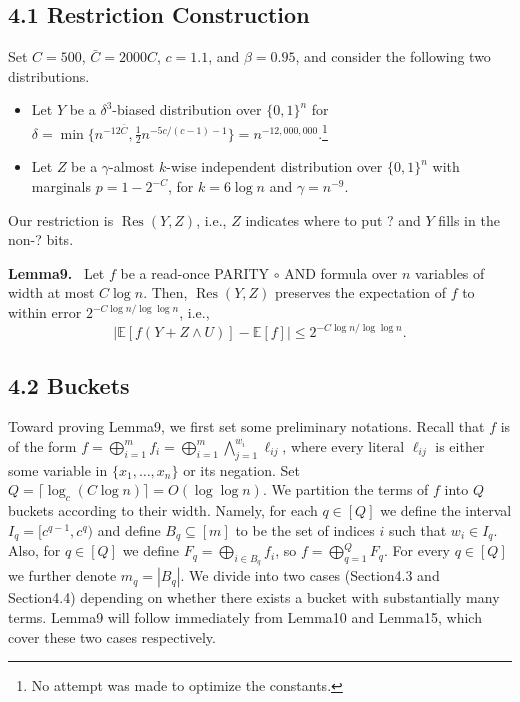 \documentclass[10pt,a4paper]{article}
\newenvironment{authorclaim}[1]{\par\medskip\noindent\textbf{#1.}\ \ignorespaces}{\par\medskip}
\begin{document}
\subsection*{4.1 Restriction Construction}
Set $C=500$, $\bar C=2000C$, $c=1.1$, and $\beta=0.95$, and consider the following two distributions.
\begin{itemize}
\item Let $Y$ be a $\delta^3$-biased distribution over $\{0,1\}^n$ for $\delta=\min\{n^{-12\bar C},\frac12n^{-5c/(c-1)-1}\}=n^{-12,000,000}$.\footnote{No attempt was made to optimize the constants.}
\item Let $Z$ be a $\gamma$-almost $k$-wise independent distribution over $\{0,1\}^n$ with marginals $p=1-2^{-C}$, for $k=6\log n$ and $\gamma=n^{-9}$.
\end{itemize}
Our restriction is $\operatorname{Res}(Y,Z)$, i.e., $Z$ indicates where to put ? and $Y$ fills in the non-? bits.
\begin{authorclaim}{Lemma9}
Let $f$ be a read-once PARITY $\circ$ AND formula over $n$ variables of width at most $C\log n$. Then, $\operatorname{Res}(Y,Z)$ preserves the expectation of $f$ to within error $2^{-C\log n/\log\log n}$, i.e.,
\[
|\mathbb E[f(Y+Z\wedge U)]-\mathbb E[f]|\le2^{-C\log n/\log\log n}.
\]
\end{authorclaim}
\subsection*{4.2 Buckets}
Toward proving Lemma9, we first set some preliminary notations. Recall that $f$ is of the form $f=\bigoplus_{i=1}^mf_i=\bigoplus_{i=1}^m\bigwedge_{j=1}^{w_i}\ell_{ij}$, where every literal $\ell_{ij}$ is either some variable in $\{x_1,\ldots,x_n\}$ or its negation.
Set $Q=\lceil\log_c(C\log n)\rceil=O(\log\log n)$. We partition the terms of $f$ into $Q$ buckets according to their width. Namely, for each $q\in[Q]$ we define the interval $I_q=[c^{q-1},c^q)$ and define $B_q\subseteq[m]$ to be the set of indices $i$ such that $w_i\in I_q$. Also, for $q\in[Q]$ we define $F_q=\bigoplus_{i\in B_q}f_i$, so $f=\bigoplus_{q=1}^QF_q$. For every $q\in[Q]$ we further denote $m_q=|B_q|$.
We divide into two cases (Section4.3 and Section4.4) depending on whether there exists a bucket with substantially many terms. Lemma9 will follow immediately from Lemma10 and Lemma15, which cover these two cases respectively.
\end{document}
